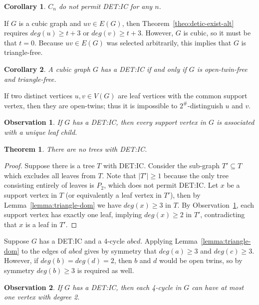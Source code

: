 \documentclass{article}
\newtheorem{theorem}{Theorem}[section]
\newtheorem{corollary}{Corollary}[section]
\newtheorem{observation}{Observation}[section]
\begin{document}
\begin{corollary}\label{cor:detic-Cn}
$C_n$ do not permit DET:IC for any $n$.
\end{corollary}

If $G$ is a cubic graph and $uv \in E(G)$, then Theorem~\ref{theo:detic-exist-alt} requires $deg(u) \ge t + 3$ or $deg(v) \ge t + 3$.
However, $G$ is cubic, so it must be that $t = 0$.
Because $uv \in E(G)$ was selected arbitrarily, this implies that $G$ is triangle-free.

\begin{corollary}\label{cor:detic-exist-alt-cubic}
A cubic graph $G$ has a DET:IC if and only if $G$ is open-twin-free and triangle-free.
\end{corollary}

If two distinct vertices $u,v \in V(G)$ are leaf vertices with the common support vertex, then they are open-twins; thus it is impossible to $2^\#$-distinguish $u$ and $v$.

\begin{observation}\label{obs-detic-support}
If $G$ has a DET:IC, then every support vertex in $G$ is associated with a unique leaf child.
\end{observation}

\begin{theorem}\label{theo:detic-tree}
There are no trees with DET:IC.
\end{theorem}
\begin{proof}
Suppose there is a tree $T$ with DET:IC.
Consider the sub-graph $T' \subseteq T$ which excludes all leaves from $T$.
Note that $|T'| \ge 1$ because the only tree consisting entirely of leaves is $P_2$, which does not permit DET:IC.
Let $x$ be a support vertex in $T$ (or equivalently a leaf vertex in $T'$), then by Lemma~\ref{lemma:triangle-dom} we have $deg(x) \ge 3$ in $T$.
By Observation~\ref{obs-detic-support}, each support vertex has exactly one leaf, implying $deg(x) \ge 2$ in $T'$, contradicting that $x$ is a leaf in $T'$.
\end{proof}

Suppose $G$ has a DET:IC and a 4-cycle $abcd$.
Applying Lemma~\ref{lemma:triangle-dom} to the edges of $abcd$ gives by symmetry that $deg(a) \ge 3$ and $deg(c) \ge 3$.
However, if $deg(b) = deg(d) = 2$, then $b$ and $d$ would be open twins, so by symmetry $deg(b) \ge 3$ is required as well.

\begin{observation}\label{obs-detic-c4}
If $G$ has a DET:IC, then each 4-cycle in $G$ can have at most one vertex with degree 2.
\end{observation}
\end{document}
